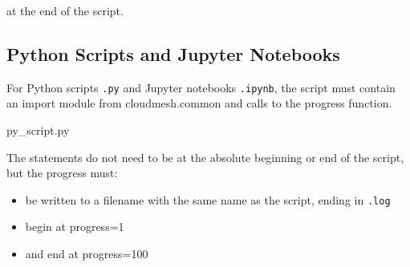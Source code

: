 at the end of the script.

\hypertarget{python-scripts-and-jupyter-notebooks}{%
\subsection{Python Scripts and Jupyter
Notebooks}\label{python-scripts-and-jupyter-notebooks}}

For Python scripts \texttt{.py} and Jupyter notebooks \texttt{.ipynb},
the script must contain an import module from cloudmesh.common and calls
to the progress function.

py\_script.py

\begin{Shaded}
\begin{Highlighting}[]
\ErrorTok{(}\KeywordTok{)}
\ErrorTok{(}\OperatorTok{=}\OperatorTok{=}\KeywordTok{)}


\ErrorTok{(}\OperatorTok{=}\OperatorTok{=}\KeywordTok{)}
\end{Highlighting}
\end{Shaded}

The statements do not need to be at the absolute beginning or end of the
script, but the progress must:

\begin{itemize}
\tightlist
\item
  be written to a filename with the same name as the script, ending in
  \texttt{.log}
\item
  begin at progress=1
\item
  and end at progress=100
\end{itemize}
